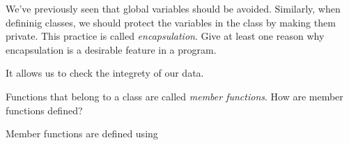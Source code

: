   \Q We've previously seen that global variables should be avoided.  Similarly, when
    defininig classes, we should protect the variables in the class by making them private.
    This practice is called {\it encapsulation}.  Give at least one reason why
    encapsulation is a desirable feature in a program.
    \begin{answer}[0.5in]
      It allows us to check the integrety of our data.
    \end{answer}

  \Q Functions that belong to a class are called {\it member functions}. How 
    are member functions defined?
    \begin{answer}[0.5in]
      Member functions are defined using 
    \end{answer}

